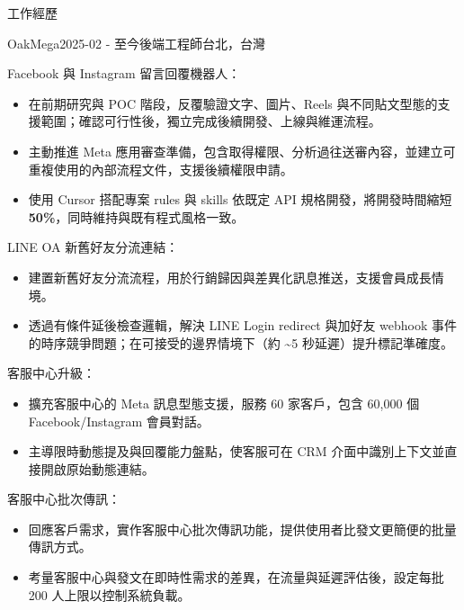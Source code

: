 \documentclass[
	11pt,
]{resume}
\newenvironment{myitemize}
  {\begin{itemize}
    \setlength{\itemsep}{-0.5em} \vspace{-0.5em}
  }
  {\end{itemize}}
\begin{document}
\begin{rSection}{工作經歷}

	\begin{rSubsection}{OakMega}{2025-02 - 至今}{後端工程師}{台北，台灣}
    \item Facebook 與 Instagram 留言回覆機器人：
    \begin{myitemize}
      \item 在前期研究與 POC 階段，反覆驗證文字、圖片、Reels 與不同貼文型態的支援範圍；確認可行性後，獨立完成後續開發、上線與維運流程。
      \item 主動推進 Meta 應用審查準備，包含取得權限、分析過往送審內容，並建立可重複使用的內部流程文件，支援後續權限申請。
      \item 使用 Cursor 搭配專案 rules 與 skills 依既定 API 規格開發，將開發時間縮短 \textbf{50\%}，同時維持與既有程式風格一致。
    \end{myitemize}
    \item LINE OA 新舊好友分流連結：
    \begin{myitemize}
      \item 建置新舊好友分流流程，用於行銷歸因與差異化訊息推送，支援會員成長情境。
      \item 透過有條件延後檢查邏輯，解決 LINE Login redirect 與加好友 webhook 事件的時序競爭問題；在可接受的邊界情境下（約 \textasciitilde5 秒延遲）提升標記準確度。
    \end{myitemize}
    \item 客服中心升級：
    \begin{myitemize}
      \item 擴充客服中心的 Meta 訊息型態支援，服務 60 家客戶，包含 60,000 個 Facebook/Instagram 會員對話。
      \item 主導限時動態提及與回覆能力盤點，使客服可在 CRM 介面中識別上下文並直接開啟原始動態連結。
    \end{myitemize}
    \item 客服中心批次傳訊：
    \begin{myitemize}
      \item 回應客戶需求，實作客服中心批次傳訊功能，提供使用者比發文更簡便的批量傳訊方式。
      \item 考量客服中心與發文在即時性需求的差異，在流量與延遲評估後，設定每批 200 人上限以控制系統負載。
    \end{myitemize}
  \end{rSubsection}


\end{rSection}
\end{document}
